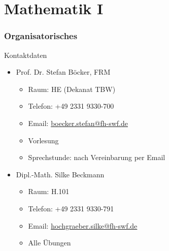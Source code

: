 \setcounter{tocdepth}{2}
\part{Mathematik I}
\begin{frame}
\tableofcontents
\end{frame}
\section*{Organisatorisches}
\begin{frame}{Kontaktdaten}
	\begin{itemize}
		\item Prof. Dr. Stefan Böcker, FRM
		\begin{itemize}
			\item Raum: HE (Dekanat TBW)
			\item Telefon: +49 2331 9330-700
		\item Email: \href{mailto:boecker.stefan@fh-swf.de}{boecker.stefan@fh-swf.de}
			\item Vorlesung
			\item Sprechstunde: nach Vereinbarung per Email
		\end{itemize}
		\item Dipl.-Math. Silke Beckmann
		\begin{itemize}
			\item Raum: H.101
			\item Telefon: +49 2331 9330-791
			\item Email: \href{mailto:hochgraeber.silke@fh-swf.de}{hochgraeber.silke@fh-swf.de}
			\item Alle Übungen
		\end{itemize}
	\end{itemize}
\end{frame}

